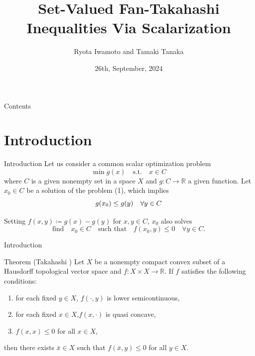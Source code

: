 \documentclass[aspectratio=169, dvipdfmx, 11pt]{beamer}
\title{Set-Valued Fan-Takahashi Inequalities Via Scalarization
}
\author[Ryota Iwamoto]{Ryota Iwamoto and Tamaki Tanaka}
\institute[Niigata Univ]{Niigata Univ}
\date{26th, September, 2024}
\newcommand{\RealNumberSet}{\mathbb{R}}
\begin{document}
\maketitle






\begin{frame}{Contents}
  \tableofcontents
\end{frame}

\section{Introduction}

\begin{frame}{Introduction}
  Let us consider a common scalar optimization problem
  \begin{equation}
    \min g(x) \quad \text{s.t.} \quad x \in C
  \end{equation}
  where $C$ is a given nonempty set in a space $X$ and $g \colon C \to \RealNumberSet$ a given function.
  Let $x_0 \in C$ be a solution of the problem (1), which implies
  \begin{equation}
    g(x_0) \leq g(y) \quad \forall y \in C \notag
  \end{equation}

  Setting $f(x,y) \coloneqq g(x) - g(y)$ for $x,y \in C$, $x_0$ also solves
  \begin{equation}
    \text{find} \quad x_0 \in C \quad \text{such that} \quad f(x_0,y) \leq 0 \quad \forall y \in C.
  \end{equation}
\end{frame}

\begin{frame}{Introduction}
  \begin{block}{Theorem (Takahashi \cite{MR399979})} %
    Let $X$ be a nonempty compact convex subset of a Hausdorff topological vector space and $f \colon X \times X \to \RealNumberSet$. If $f$ satisfies
    the following conditions:
    \begin{enumerate}
      \item for each fixed $y \in X$, $f(\cdot,y)$ is lower semicontinuous,
      \item for each fixed $x \in X$,$f(x,\cdot)$ is quasi concave,
      \item $f(x,x) \leq 0$ for all $x \in X$,
    \end{enumerate}
    then there exists $\bar{x} \in X$ such that $f(\bar{x},y) \leq 0$ for all $y \in X$.
  \end{block}
\end{frame}
\end{document}
